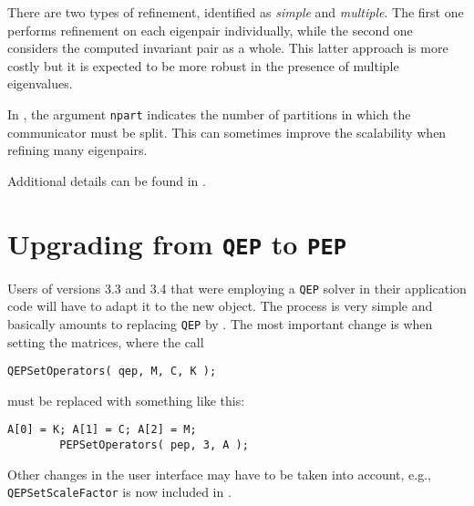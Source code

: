 There are two types of refinement, identified as \emph{simple} and \emph{multiple}. The first one performs refinement on each eigenpair individually, while the second one considers the computed invariant pair as a whole. This latter approach is more costly but it is expected to be more robust in the presence of multiple eigenvalues.

In , the argument \texttt{npart} indicates the number of partitions in which the communicator must be split. This can sometimes improve the scalability when refining many eigenpairs.

Additional details can be found in \citep{Campos:2016:PIR}.

\section{\label{sec:qeppep}Upgrading from \texttt{QEP} to \texttt{PEP}}

Users of \slepc versions 3.3 and 3.4 that were employing a \texttt{QEP} solver in their application code will have to adapt it to the new  object. The process is very simple and basically amounts to replacing \texttt{QEP} by . The most important change is when setting the matrices, where the call
	\begin{Verbatim}[fontsize=\small]
        QEPSetOperators( qep, M, C, K );
	\end{Verbatim}
must be replaced with something like this:
	\begin{Verbatim}[fontsize=\small]
        A[0] = K; A[1] = C; A[2] = M;
        PEPSetOperators( pep, 3, A );
	\end{Verbatim}

Other changes in the user interface may have to be taken into account, e.g., \texttt{QEPSetScaleFactor} is now included in .


